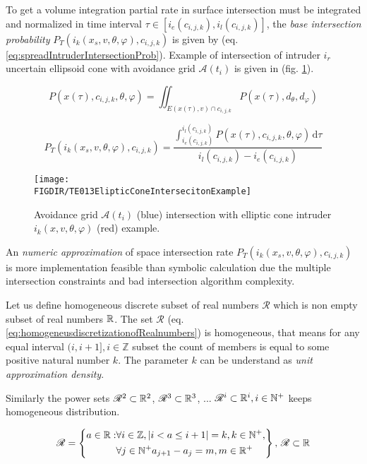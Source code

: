 To get a volume integration partial rate in surface intersection must be integrated and normalized in time interval $\tau\in[i_e(c_{i,j,k}),i_l(c_{i,j,k})]$, the \emph{base intersection probability} $P_T(i_k({x}_s,{v},\theta,\varphi),c_{i,j,k})$ is given by (eq. \ref{eq:spreadIntruderIntersectionProb}). Example of intersection of intruder $i_r$ uncertain ellipsoid cone with avoidance grid $\mathscr{A}(t_i)$ is given in (fig. \ref{fig:ellipticConeIntersectionExample}).

\begin{equation}\label{eq:spreadIntersectionProbFixedtau}
    P({x}(\tau),c_{i,j,k},\theta,\varphi) =\iint_{E({x}(\tau),{v})\cap c_{i,j,k}} P({x}(\tau),d_\theta,d_\varphi)
\end{equation}

\begin{equation}\label{eq:spreadIntruderIntersectionProb}
    P_T(i_k({x}_s,{v},\theta,\varphi),c_{i,j,k})=\frac{\int_{i_e(c_{i,j,k})}^{i_l(c_{i,j,k})} P({x}(\tau),c_{i,j,k},\theta,\varphi)\,\text{d}\tau}{i_l(c_{i,j,k})-i_e(c_{i,j,k})}
\end{equation}

\begin{figure}[H]
    \centering
    \texttt{[image: \\FIGDIR/TE013ElipticConeIntersecitonExample]}
    \caption{Avoidance grid $\mathscr{A}(t_i)$ (blue) intersection with elliptic cone intruder $i_k({x},{v},\theta,\varphi)$ (red) example.}
    \label{fig:ellipticConeIntersectionExample}
\end{figure}

\noindent An \emph{numeric approximation} of space intersection rate $P_T(i_k({x}_s,{v},\theta,\varphi),c_{i,j,k})$ is more implementation feasible than symbolic calculation due the multiple intersection constraints and bad intersection algorithm complexity. 

Let us define homogeneous discrete subset of real numbers $\mathscr{R}$ which is non empty subset of real numbers $\mathbb{R}$. The set $\mathscr{R}$ (eq. \ref{eq:homogeneusdiscretizationofRealnumbers}) is homogeneous, that means for any equal interval $(i,i+1],i\in\mathbb{Z}$ subset the count of members is equal to some positive natural number $k$. The parameter $k$ can be understand as \emph{unit approximation density}.

Similarly the power sets $\mathscr{R}^2\subset\mathbb{R}^2$, $\mathscr{R}^3\subset\mathbb{R}^3$, ... $\mathscr{R}^i\subset\mathbb{R}^i,i\in\mathbb{N}^+$ keeps homogeneous distribution.

\begin{equation}\label{eq:homogeneusdiscretizationofRealnumbers}
    \mathscr{R} = \left\{\begin{aligned}a\in\mathbb{R}:&\forall i\in\mathbb{Z},|i<a\le i+1|=k,k\in\mathbb{N}^+, \\&\forall j\in \mathbb{N}^+a_{j+1}-a_{j}=m,m\in\mathbb{R}^+\end{aligned}\right\},\,\mathscr{R}\subset\mathbb{R}
\end{equation}

